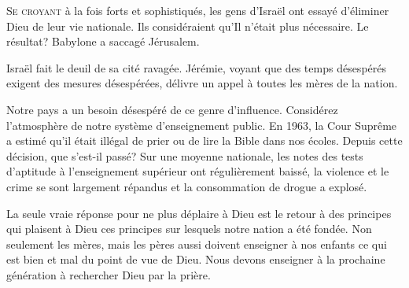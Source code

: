 \jrnlmonth






\lettrine{S}{e croyant} à la fois forts et sophistiqués,
 les gens d'Israël ont essayé d'éliminer Dieu de leur vie nationale.
 Ils considéraient qu'Il n'était plus nécessaire.
 Le résultat? Babylone a saccagé Jérusalem. 

Israël fait le deuil de sa cité ravagée.
 Jérémie, voyant que des temps désespérés exigent des mesures
 désespérées, délivre un appel à toutes les mères de la nation. 


Notre pays a un besoin désespéré de ce genre d'influence.
 Considérez l'atmosphère de notre système d'enseignement public.
 En 1963, la Cour Suprême a estimé qu'il était illégal de prier
 ou de lire la Bible dans nos écoles.
 Depuis cette décision, que s'est-il passé?
 Sur une moyenne nationale, les notes des tests d'aptitude
 à l'enseignement supérieur ont régulièrement baissé,
 la violence et le crime se sont largement répandus
 et la consommation de drogue a explosé. 

La seule vraie réponse pour ne plus déplaire à Dieu
 est le retour à des principes qui plaisent à Dieu
 \ocadr ces principes sur lesquels notre nation a été fondée.
 Non seulement les mères, mais les pères aussi doivent enseigner
 à nos enfants ce qui est bien et mal \ocadr du point de vue de Dieu.
 Nous devons enseigner à la prochaine génération à rechercher Dieu
 par la prière. 

